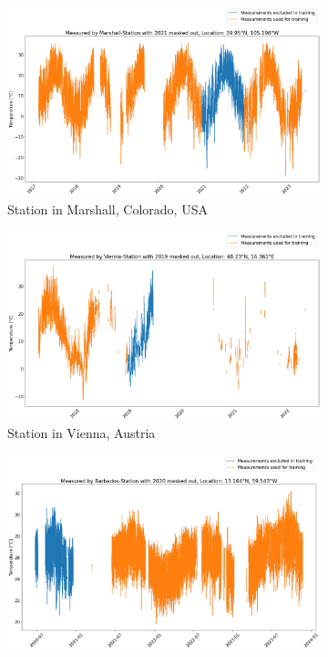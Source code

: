 \begin{figure}
    \centering
    \begin{subfigure}{0.672\textwidth}
        \includegraphics[width=\textwidth]{resources/images/charts/marshall_available_measurements.png}
        \caption{Station in Marshall, Colorado, USA}
        \label{fig:available_measurements_marshall}
    \end{subfigure}
    \begin{subfigure}{0.672\textwidth}
        \includegraphics[width=\textwidth]{resources/images/charts/vienna_available_measurements.png}
        \caption{Station in Vienna, Austria}
        \label{fig:available_measurements_vienna}
    \end{subfigure}
    \begin{subfigure}{0.672\textwidth}
        \includegraphics[width=\textwidth]{resources/images/charts/barbados_available_measurements.png}

\end{subfigure}
\end{figure}

